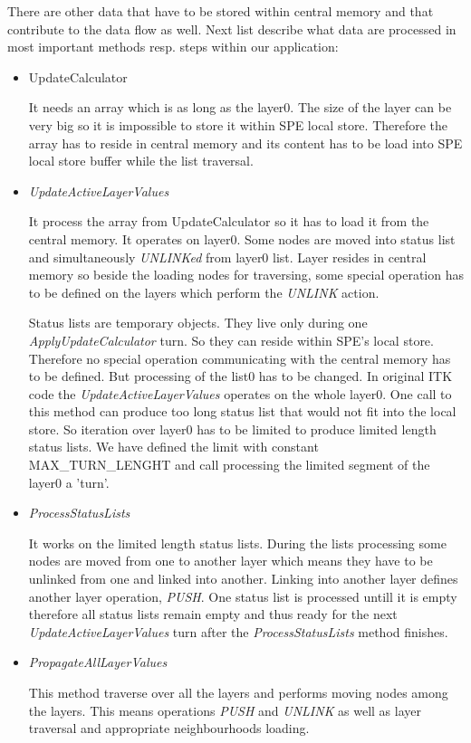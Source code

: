\par
There are other data that have to be stored within central memory and that contribute to the data flow as well.
Next list describe what data are processed in most important methods resp. steps within our application:

\begin{itemize}
\item UpdateCalculator
\par
It needs an array which is as long as the layer0.
The size of the layer can be very big so it is impossible to store it within SPE local store.
Therefore the array has to reside in central memory and its content has to be load into SPE local store buffer while the list traversal.

\item \emph{UpdateActiveLayerValues}
\par
It process the array from UpdateCalculator so it has to load it from the central memory.
It operates on layer0.
Some nodes are moved into status list and simultaneously \emph{UNLINKed} from layer0 list.
Layer resides in central memory so beside the loading nodes for traversing, some special operation has to be defined on the layers which perform the \emph{UNLINK} action.

\par
Status lists are temporary objects.
They live only during one \mbox{\emph{ApplyUpdateCalculator}} turn.
So they can reside within SPE's local store.
Therefore no special operation communicating with the central memory has to be defined.
But processing of the list0 has to be changed.
In original ITK code the \mbox{\emph{UpdateActiveLayerValues}} operates on the whole layer0.
One call to this method can produce too long status list that would not fit into the local store.
So iteration over layer0 has to be limited to produce limited length status lists.
We have defined the limit with constant \mbox{MAX\_TURN\_LENGHT} and call processing the limited segment of the layer0 a 'turn'.

\item \emph{ProcessStatusLists}
\par
It works on the limited length status lists.
During the lists processing some nodes are moved from one to another layer which means they have to be unlinked from one and linked into another.
Linking into another layer defines another layer operation, \emph{PUSH}.
One status list is processed untill it is empty therefore all status lists remain empty and thus ready for the next \emph{UpdateActiveLayerValues} turn after the \emph{ProcessStatusLists} method finishes.

\item \emph{PropagateAllLayerValues}
\par
This method traverse over all the layers and performs moving nodes among the layers.
This means operations \emph{PUSH} and \emph{UNLINK} as well as layer traversal and appropriate neighbourhoods loading.
\end{itemize}

